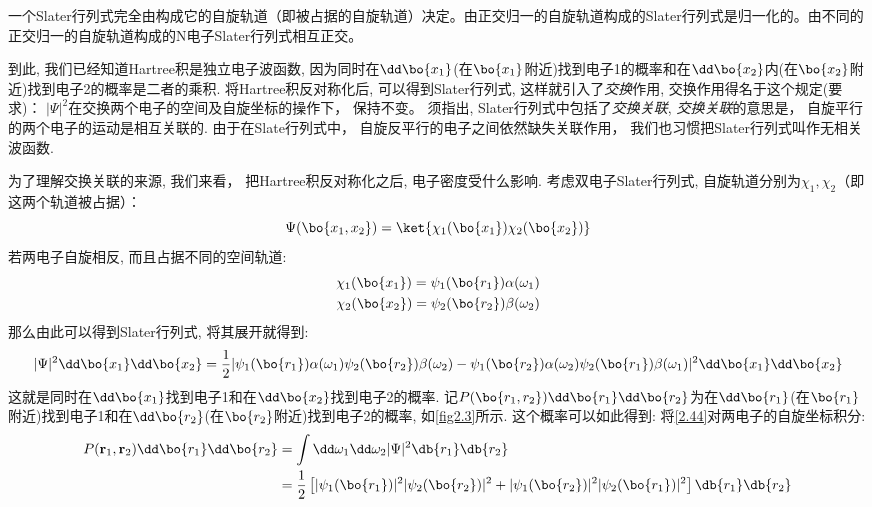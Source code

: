 一个Slater行列式完全由构成它的自旋轨道（即被占据的自旋轨道）决定。由正交归一的自旋轨道构成的Slater行列式是归一化的。由不同的正交归一的自旋轨道构成的N电子Slater行列式相互正交。


到此, 
我们已经知道Hartree积是独立电子波函数, 
因为同时在$\dd\bo{x_1}$(在$\bo{x_1}$附近)找到电子1的概率和在$\dd\bo{x_2}$内(在$\bo{x_2}$附近)找到电子2的概率是二者的乘积. 
将Hartree积反对称化后, 
可以得到Slater行列式, 
这样就引入了\emph{交换}作用, 
交换作用得名于这个规定(要求)： $|\Psi|^2$在交换两个电子的空间及自旋坐标的操作下，
保持不变。 
须指出, 
Slater行列式中包括了\emph{交换关联}, 
\emph{交换关联}的意思是，
自旋平行的两个电子的运动是相互关联的. 
由于在Slate行列式中，
自旋反平行的电子之间依然缺失关联作用，
我们也习惯把Slater行列式叫作无相关波函数.


为了理解交换关联的来源, 
我们来看，
把Hartree积反对称化之后, 
电子密度受什么影响. 
考虑双电子Slater行列式, 
自旋轨道分别为$\chi_1,\chi_2$（即这两个轨道被占据）：
\begin{equation}
\Psi(\bo{x_1,x_2})=\ket{\chi_1(\bo{x_1})\chi_2(\bo{x_2})}
\end{equation}
若两电子自旋相反, 
而且占据不同的空间轨道:
\begin{align}
\chi_1(\bo{x_1})=\psi_1(\bo{r_1})\alpha(\omega_1)\\
\chi_2(\bo{x_2})=\psi_2(\bo{r_2})\beta(\omega_2)
\end{align}
那么由此可以得到Slater行列式, 
将其展开就得到:
\begin{equation}
\label{2.44}
|\Psi|^2\dd\bo{x_1}\dd\bo{x_2}=\frac{1}{2}|\psi_1(\bo{r_1})\alpha(\omega_1)\psi_2(\bo{r_2})\beta(\omega_2)-\psi_1(\bo{r_2})\alpha(\omega_2)\psi_2(\bo{r_1})\beta(\omega_1)|^2\dd\bo{x_1}\dd\bo{x_2}
\end{equation}
这就是同时在$\dd\bo{x_1}$找到电子1和在$\dd\bo{x_2}$找到电子2的概率. 
记$P(\bo{r_1,r_2})\dd\bo{r_1}\dd\bo{r_2}$为在$\dd\bo{r_1}$(在$\bo{r_1}$附近)找到电子1和在$\dd\bo{r_2}$(在$\bo{r_2}$附近)找到电子2的概率, 
如\autoref{fig2.3}所示. 
这个概率可以如此得到: 将\autoref{2.44}对两电子的自旋坐标积分:
\begin{align}
\label{2.45}
P(\mathbf{r}_1,\mathbf{r}_2)\dd\bo{r_1}\dd\bo{r_2}&=\int\dd\omega_1\dd\omega_2|\Psi|^2\db{r_1}\db{r_2}\notag\\
&=\frac{1}{2}\left[|\psi_1(\bo{r_1})|^2|\psi_2(\bo{r_2})|^2+|\psi_1(\bo{r_2})|^2|\psi_2(\bo{r_1})|^2\right]\db{r_1}\db{r_2}
\end{align}

